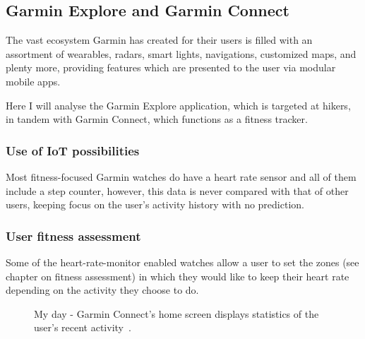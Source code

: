 \subsection{Garmin Explore and Garmin Connect}
The vast ecosystem Garmin has created for their users is filled with an assortment of wearables, radars, smart lights, navigations, customized maps, and plenty more, providing features which are presented to the user via modular mobile apps.

Here I will analyse the Garmin Explore application, which is targeted at hikers, in tandem with Garmin Connect, which functions as a fitness tracker.

\subsubsection*{Use of IoT possibilities}
Most fitness-focused Garmin watches do have a heart rate sensor and all of them include a step counter, however, this data is never compared with that of other users, keeping focus on the user's activity history with no prediction.
\subsubsection*{User fitness assessment}
Some of the heart-rate-monitor enabled watches allow a user to set the zones (see chapter on fitness assessment) in which they would like to keep their heart rate depending on the activity they choose to do.

\begin{figure}[h]
    \centering
        \caption{My day - Garmin Connect's home screen displays statistics of the user's recent activity~\cite{garmin-my-day-img}.}
        \label{garmin-my-day-img}
\end{figure}

